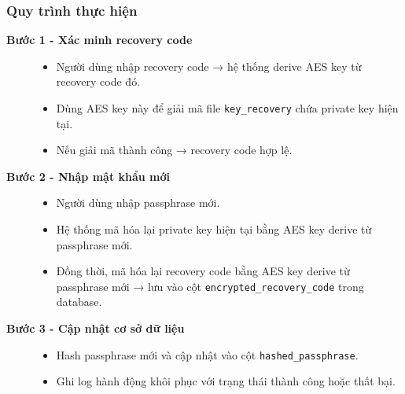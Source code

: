 \subsubsection*{Quy trình thực hiện}
\begin{description}

    \item[\textbf{Bước 1 - Xác minh recovery code}]
    \begin{itemize}
        \item Người dùng nhập recovery code → hệ thống derive AES key từ recovery code đó.
        \item Dùng AES key này để giải mã file \texttt{key\_recovery} chứa private key hiện tại.
        \item Nếu giải mã thành công → recovery code hợp lệ.
    \end{itemize}

    \item[\textbf{Bước 2 - Nhập mật khẩu mới}]
    \begin{itemize}
        \item Người dùng nhập passphrase mới.
        \item Hệ thống mã hóa lại private key hiện tại bằng AES key derive từ passphrase mới.
        \item Đồng thời, mã hóa lại recovery code bằng AES key derive từ passphrase mới → lưu vào cột \texttt{encrypted\_recovery\_code} trong database.
    \end{itemize}

    \item[\textbf{Bước 3 - Cập nhật cơ sở dữ liệu}]
    \begin{itemize}
        \item Hash passphrase mới và cập nhật vào cột \texttt{hashed\_passphrase}.
        \item Ghi log hành động khôi phục với trạng thái thành công hoặc thất bại.
    \end{itemize}
\end{description}

